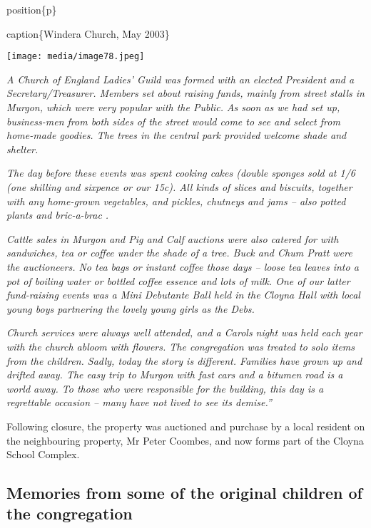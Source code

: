 position\{p\}

caption\{Windera Church, May 2003\}

\texttt{[image: media/image78.jpeg]}

\emph{A Church of England Ladies' Guild was formed with an elected President and a Secretary/Treasurer. Members set about raising funds, mainly from street stalls in Murgon, which were very popular with the Public.} \emph{As soon as we had set up, business-men from both sides of the street would come to see and select from home-made goodies. The trees in the central park provided welcome shade and shelter.}

\emph{The day before these events was spent cooking cakes (double sponges sold at 1/6 (one shilling and sixpence or our 15c). All kinds of slices and biscuits, together with any home-grown vegetables, and pickles, chutneys and jams -- also potted plants and bric-a-brac .}

\emph{Cattle sales in Murgon and Pig and Calf auctions were also catered for with sandwiches, tea or coffee under the shade of a tree. Buck and Chum Pratt were the auctioneers. No tea bags or instant coffee those days -- loose tea leaves into a pot of boiling water or bottled coffee essence and lots of milk. One of our latter fund-raising events was a Mini Debutante Ball held in the Cloyna Hall with local young boys partnering the lovely young girls as the Debs.}

\emph{Church services were always well attended, and a Carols night was held each year with the church abloom with flowers. The congregation was treated to solo items from the children. Sadly, today the story is different. Families have grown up and drifted away. The easy trip to Murgon with fast cars and a bitumen road is a world away. To those who were responsible for the building, this day is a regrettable occasion -- many have not lived to see its demise.''}

Following closure, the property was auctioned and purchase by a local resident on the neighbouring property, Mr Peter Coombes, and now forms part of the Cloyna School Complex.

\hypertarget{memories-from-some-of-the-original-children-of-the-congregation}{%
\subsection{Memories from some of the original children of the congregation}\label{memories-from-some-of-the-original-children-of-the-congregation}}

